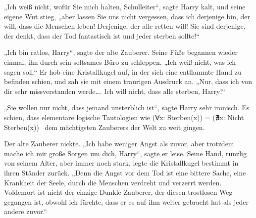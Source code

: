 „Ich weiß nicht, wofür Sie mich halten, Schulleiter“, sagte Harry kalt, und seine eigene Wut stieg, „aber lassen Sie uns nicht vergessen, dass ich derjenige bin, der will, dass die Menschen leben! Derjenige, der alle retten will! Sie sind derjenige, der denkt, dass der Tod fantastisch ist und jeder sterben sollte!“

„Ich bin ratlos, Harry“, sagte der alte Zauberer. Seine Füße begannen wieder einmal, ihn durch sein seltsames Büro zu schleppen. „Ich weiß nicht, was ich sagen soll.“ Er hob eine Kristallkugel auf, in der sich eine entflammte Hand zu befinden schien, und sah sie mit einem traurigen Ausdruck an. „Nur, dass ich von dir sehr missverstanden werde…. Ich will nicht, dass alle sterben, Harry!“

„Sie wollen nur nicht, dass jemand unsterblich ist“, sagte Harry sehr ironisch. Es schien, dass elementare logische Tautologien wie (Ɐx: Sterben(x)) = (∄x: Nicht Sterben(x)) ~dem mächtigsten Zauberers der Welt zu weit gingen.%

Der alte Zauberer nickte. „Ich habe weniger Angst als zuvor, aber trotzdem mache ich mir große Sorgen um dich, Harry“, sagte er leise. Seine Hand, runzlig von seinem Alter, aber immer noch stark, legte die Kristallkugel bestimmt in ihren Ständer zurück. „Denn die Angst vor dem Tod ist eine bittere Sache, eine Krankheit der Seele, durch die Menschen verdreht und verzerrt werden. Voldemort ist nicht der einzige Dunkle Zauberer, der diesen trostlosen Weg gegangen ist, obwohl ich fürchte, dass er es auf ihm weiter gebracht hat als jeder andere zuvor.“

